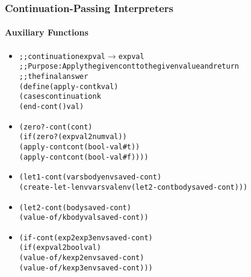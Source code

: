 \documentclass{beamer}
\newcommand{\arrow}{\(\rightarrow\)}
\begin{document}
\begin{frame}[fragile]
\frametitle{Continuation-Passing Interpreters}
\framesubtitle{Auxiliary Functions}
\begin{scriptsize}
\begin{itemize}
\item<1->
\begin{alltt}
;; continuation expval \arrow{} expval
;; Purpose: Apply the given cont to the given value and return
;;          the final answer
(define (apply-cont k val)
 (cases continuation k
   (end-cont () val)
\end{alltt}

\item<2->
\begin{alltt}
   (zero?-cont (cont)
     (if (zero? (expval2num val))
                (apply-cont cont (bool-val #t))
                (apply-cont cont (bool-val #f))))
\end{alltt}

\item<3->
\begin{alltt}
   (let1-cont (vars body env saved-cont)
    (create-let-lenv vars val env (let2-cont body saved-cont)))
\end{alltt}

\item<4->
\begin{alltt}
   (let2-cont (body saved-cont)
     (value-of/k body val saved-cont))
\end{alltt}

\item<5->
\begin{alltt}
   (if-cont (exp2 exp3 env saved-cont)
     (if (expval2bool val)
         (value-of/k exp2 env saved-cont)
         (value-of/k exp3 env saved-cont)))
\end{alltt}

\end{itemize}
\end{scriptsize}
\end{frame}
\end{document}
